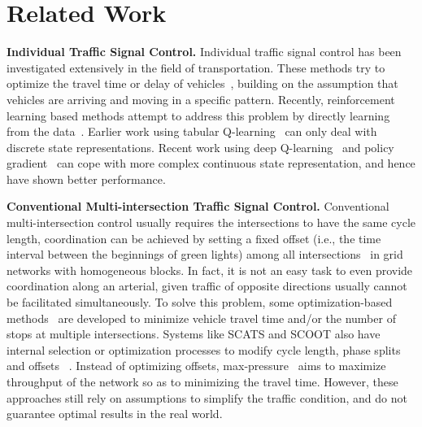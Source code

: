 
\chapter{Related Work}
\label{chap:related}
\textbf{Individual Traffic Signal Control.}
Individual traffic signal control has been investigated extensively in the field of transportation. These methods try to optimize the travel time or delay of vehicles~\cite{Gart83,Henr84,Boil06,SeHe97,Liang18}, building on the assumption that vehicles are arriving and moving in a specific pattern. Recently, reinforcement learning based methods attempt to address this problem by directly learning from the data~\cite{Wier00,MaDH16}. Earlier work using tabular Q-learning~\cite{APK03,ElAb10} can only deal with discrete state representations. Recent work using deep Q-learning~\cite{liLW16,VaOl16,wei2018intellilight} and policy gradient~\cite{MSCH17,Casa17PG} can cope with more complex continuous state representation, and hence have shown better performance.

\textbf{Conventional Multi-intersection Traffic Signal Control.}
Conventional multi-intersection control usually requires the intersections to have the same cycle length, coordination can be achieved by setting a fixed offset (i.e., the time interval between the beginnings of green lights) among all intersections~\cite{urbanik2015signal} in grid networks with homogeneous blocks. In fact, it is not an easy task to even provide coordination along an arterial, given traffic of opposite directions usually cannot be facilitated simultaneously. To solve this problem, some optimization-based methods~\cite{robertson1969transyt,little1981maxband} are developed to minimize vehicle travel time and/or the number of stops at multiple intersections. 
Systems like SCATS and SCOOT also have internal selection or optimization processes to modify cycle length, phase splits and offsets ~\cite{kergaye2010comparative}. Instead of optimizing offsets, max-pressure~\cite{MP13,MP13book} aims to maximize throughput of the network so as to minimizing the travel time. However, these approaches still rely on assumptions to simplify the traffic condition, and do not guarantee optimal results in the real world.

